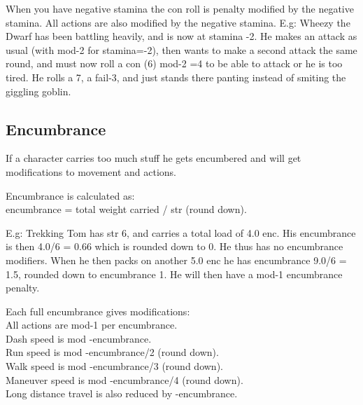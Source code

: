 When you have negative stamina the con roll is penalty modified by the negative stamina. All actions are also modified by the negative stamina.
E.g: Wheezy the Dwarf has been battling heavily, and is now at stamina -2. He makes an attack as usual (with mod-2 for stamina=-2), then wants to make a second attack the same round, and must now roll a con (6) mod-2 =4 to be able to attack or he is too tired. He rolls a 7, a fail-3, and just stands there panting instead of smiting the giggling goblin.



















\subsection*{Encumbrance}
If a character carries too much stuff he gets encumbered and will get modifications to movement and actions.

Encumbrance is calculated as: \\
encumbrance = total weight carried / str (round down).

E.g: Trekking Tom has str 6, and carries a total load of 4.0 enc. His encumbrance is then 4.0/6 = 0.66 which is rounded down to 0. He thus has no encumbrance modifiers. When he then packs on another 5.0 enc he has encumbrance 9.0/6 = 1.5, rounded down to encumbrance 1. He will then have a mod-1 encumbrance penalty.

Each full encumbrance gives modifications: \\
All actions are mod-1 per encumbrance. \\
Dash speed is mod -encumbrance. \\
Run speed is mod  -encumbrance/2 (round down). \\
Walk speed is mod -encumbrance/3 (round down). \\
Maneuver speed is mod -encumbrance/4 (round down). \\
Long distance travel is also reduced by -encumbrance.

